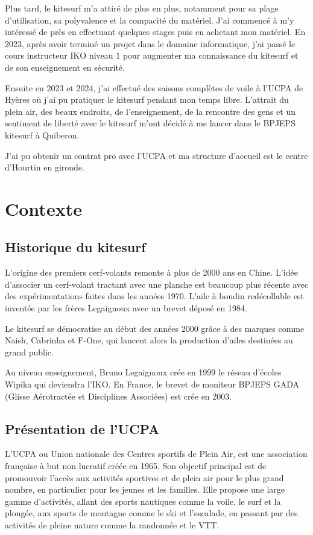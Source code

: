 \documentclass[11pt,a4paper]{report}
\begin{document}
Plus tard, le kitesurf m'a attiré de plus en plus, 
notamment pour sa plage d'utilisation, sa polyvalence et la 
compacité du matériel. J'ai commencé à m'y intéressé de pr\`es en 
effectuant quelques stages puis en achetant mon matériel.
En 2023, après avoir terminé un projet
dans le domaine informatique, j'ai passé le cours instructeur
IKO\cite{iko} niveau 1 pour augmenter ma connaissance du kitesurf
et de son enseignement en sécurité.

Ensuite en 2023 et 2024, j'ai effectué des saisons complètes de voile
à l'UCPA\cite{ucpa} de Hyères o\`u j'ai pu pratiquer le kitesurf
pendant mon temps libre. L'attrait du plein air, des beaux endroits,
de l'enseignement, de la rencontre des gens et un sentiment de liberté
avec le kitesurf  m'ont décidé à me lancer dans le BPJEPS kitesurf 
à Quiberon.

J'ai  pu obtenir un contrat pro avec l'UCPA et 
ma structure d'accueil est le centre d'Hourtin en gironde.

\section{Contexte}
\subsection{Historique du kitesurf}

L'origine des premiers cerf-volants remonte à plus de 2000 ans en Chine.
L'idée d'associer un cerf-volant tractant avec une planche est beaucoup
plus récente avec des expérimentations  faites 
dans les années 1970. L'aile à boudin redécollable est inventée 
par les frères Legaignoux avec un brevet déposé en 1984\cite{brevet_kite}.

Le kitesurf se démocratise au début des années 2000 grâce à des
marques comme Naish, Cabrinha et F-One, qui lancent alors la 
production d’ailes destinées au grand public.

Au niveau enseignement, Bruno Legaignoux crée en 1999 le
réseau d'écoles Wipika qui deviendra l'IKO\cite{iko}.
En France, le brevet de moniteur BPJEPS GADA (Glisse Aérotractée 
et Disciplines Associées) est crée en 2003.

\subsection{Présentation de l'UCPA}

L'UCPA ou Union nationale des Centres sportifs de Plein Air, est une association
française à but non lucratif  créée en 1965. Son objectif principal est
de promouvoir l'accès aux activités sportives et de plein air pour le plus grand
nombre, en particulier pour les jeunes et les familles. Elle propose une large
gamme d'activités, allant des sports nautiques comme la voile, le surf et la plongée,
aux sports de montagne comme le ski et l'escalade, en passant par des activités de
pleine nature comme la randonnée et le VTT.
\end{document}
